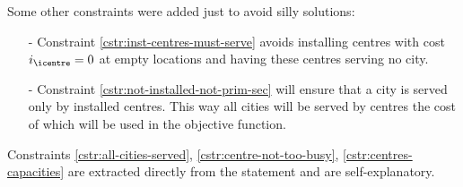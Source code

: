 Some other constraints were added just to avoid silly solutions:

\begin{itemize}
    
    \item[-] Constraint \ref{cstr:inst-centres-must-serve} avoids installing centres with cost
    $i_\icentre = 0$ at empty locations and having these centres serving no city.
    
    \item[-] Constraint \ref{cstr:not-installed-not-prim-sec} will ensure that a city is served only
    by installed centres. This way all cities will be served by centres the cost of which will be used
    in the objective function.
    
\end{itemize}

Constraints \ref{cstr:all-cities-served}, \ref{cstr:centre-not-too-busy}, \ref{cstr:centres-capacities}
are extracted directly from the statement and are self-explanatory.

